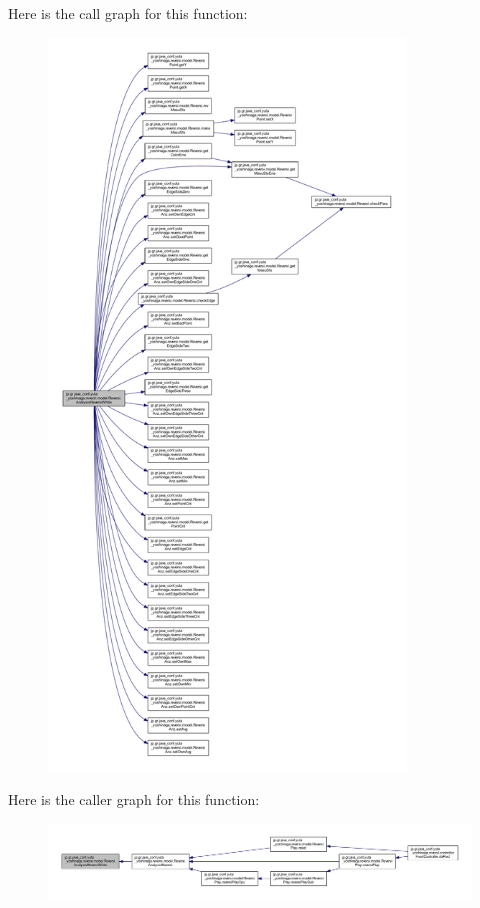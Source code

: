 Here is the call graph for this function\+:
\nopagebreak
\begin{figure}[H]
\begin{center}
\leavevmode
\includegraphics[height=550pt]{classjp_1_1gr_1_1java__conf_1_1yuta__yoshinaga_1_1reversi_1_1model_1_1_reversi_a519adbc5ec3bf5433fdb79bf8049cc75_cgraph}
\end{center}
\end{figure}
Here is the caller graph for this function\+:
\nopagebreak
\begin{figure}[H]
\begin{center}
\leavevmode
\includegraphics[width=350pt]{classjp_1_1gr_1_1java__conf_1_1yuta__yoshinaga_1_1reversi_1_1model_1_1_reversi_a519adbc5ec3bf5433fdb79bf8049cc75_icgraph}
\end{center}
\end{figure}
